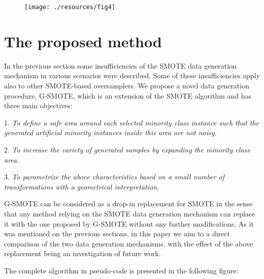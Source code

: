 \documentclass[parskip=full]{scrartcl}
\begin{document}
\begin{figure}[H]
	\centering
	\texttt{[image: ./resources/fig4]}
\end{figure}

\section{The proposed method}

In the previous section some insufficiencies of the SMOTE data generation
mechanism in various scenarios were described. Some of these insufficiencies
apply also to other SMOTE-based oversamplers. We propose a novel data generation
procedure, G-SMOTE, which is an extension of the SMOTE algorithm and has three
main objectives:

1. \textit{To define a safe area around each selected minority class instance
such that the generated artificial minority instances inside this area are not
noisy.}

2. \textit{To increase the variety of generated samples by expanding the
minority class area.}

3. \textit{To parametrize the above characteristics based on a small number of
transformations with a geometrical interpretation.}

G-SMOTE can be considered as a drop-in replacement for SMOTE in the sense that
any method relying on the SMOTE data generation mechanism can replace it with
the one proposed by G-SMOTE without any further modifications. As it was
mentioned on the previous sections, in this paper we aim to a direct comparison
of the two data generation mechanisms, with the effect of the above replacement
being an investigation of future work.

The complete algorithm in pseudo-code is presented in the following figure:
\end{document}

